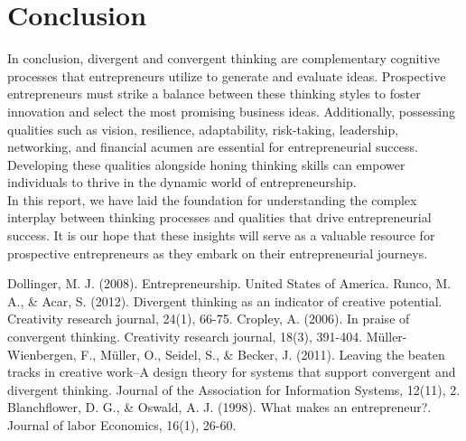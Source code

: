 \documentclass[12pt]{report}
\begin{document}
\newpage
\section*{Conclusion}
In conclusion, divergent and convergent thinking are complementary cognitive processes that entrepreneurs utilize to generate and evaluate ideas. Prospective entrepreneurs must strike a balance between these thinking styles to foster innovation and select the most promising business ideas. Additionally, possessing qualities such as vision, resilience, adaptability, risk-taking, leadership, networking, and financial acumen are essential for entrepreneurial success. Developing these qualities alongside honing thinking skills can empower individuals to thrive in the dynamic world of entrepreneurship.\\

In this report, we have laid the foundation for understanding the complex interplay
between thinking processes and qualities that drive entrepreneurial success. It is our hope
that these insights will serve as a valuable resource for prospective entrepreneurs as they
embark on their entrepreneurial journeys.









\newpage
\renewcommand{\bibname}{References}
\begin{thebibliography}{}
    Dollinger, M. J. (2008). Entrepreneurship. United States of America.
    Runco, M. A., \& Acar, S. (2012). Divergent thinking as an indicator of creative potential. Creativity research journal, 24(1), 66-75.
    Cropley, A. (2006). In praise of convergent thinking. Creativity research journal, 18(3), 391-404.
    Müller-Wienbergen, F., Müller, O., Seidel, S., \& Becker, J. (2011). Leaving the beaten tracks in creative work–A design theory for systems that support convergent and divergent thinking. Journal of the Association for Information Systems, 12(11), 2.
    Blanchflower, D. G., \& Oswald, A. J. (1998). What makes an entrepreneur?. Journal of labor Economics, 16(1), 26-60.
\end{thebibliography}
\end{document}
